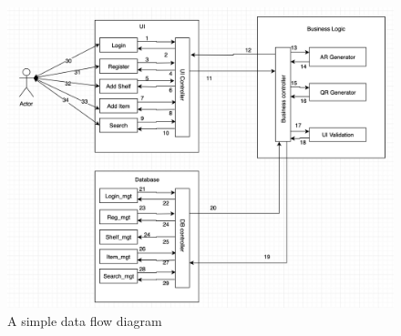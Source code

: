 

\begin{figure}[h!]
	\centering
 	\includegraphics[width=\textwidth]{images/dataflow}
 \caption{A simple data flow diagram}
\end{figure}
